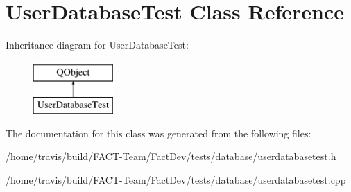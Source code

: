 \hypertarget{classUserDatabaseTest}{\section{User\-Database\-Test Class Reference}
\label{classUserDatabaseTest}
}
Inheritance diagram for User\-Database\-Test\-:\begin{figure}[H]
\begin{center}
\leavevmode
\includegraphics[height=2.000000cm]{d7/dc1/classUserDatabaseTest}
\end{center}
\end{figure}


The documentation for this class was generated from the following files\-:\begin{DoxyCompactItemize}
\item 
/home/travis/build/\-F\-A\-C\-T-\/\-Team/\-Fact\-Dev/tests/database/userdatabasetest.\-h\item 
/home/travis/build/\-F\-A\-C\-T-\/\-Team/\-Fact\-Dev/tests/database/userdatabasetest.\-cpp\end{DoxyCompactItemize}
